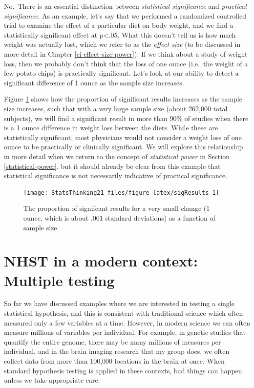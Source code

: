 \documentclass[
  12pt,
]{book}
\begin{document}
No.~There is an essential distinction between \emph{statistical significance} and \emph{practical significance}. As an example, let's say that we performed a randomized controlled trial to examine the effect of a particular diet on body weight, and we find a statistically significant effect at p\textless.05. What this doesn't tell us is how much weight was actually lost, which we refer to as the \emph{effect size} (to be discussed in more detail in Chapter \ref{ci-effect-size-power}). If we think about a study of weight loss, then we probably don't think that the loss of one ounce (i.e.~the weight of a few potato chips) is practically significant. Let's look at our ability to detect a significant difference of 1 ounce as the sample size increases.

Figure \ref{fig:sigResults} shows how the proportion of significant results increases as the sample size increases, such that with a very large sample size (about 262,000 total subjects), we will find a significant result in more than 90\% of studies when there is a 1 ounce difference in weight loss between the diets. While these are statistically significant, most physicians would not consider a weight loss of one ounce to be practically or clinically significant. We will explore this relationship in more detail when we return to the concept of \emph{statistical power} in Section \ref{statistical-power}, but it should already be clear from this example that statistical significance is not necessarily indicative of practical significance.

\begin{figure}
\texttt{[image: StatsThinking21\_files/figure-latex/sigResults-1]} \caption{The proportion of signifcant results for a very small change (1 ounce, which is about .001 standard deviations) as a function of sample size.}\label{fig:sigResults}
\end{figure}

\hypertarget{nhst-in-a-modern-context-multiple-testing}{%
\section{NHST in a modern context: Multiple testing}\label{nhst-in-a-modern-context-multiple-testing}}

So far we have discussed examples where we are interested in testing a single statistical hypothesis, and this is consistent with traditional science which often measured only a few variables at a time. However, in modern science we can often measure millions of variables per individual. For example, in genetic studies that quantify the entire genome, there may be many millions of measures per individual, and in the brain imaging research that my group does, we often collect data from more than 100,000 locations in the brain at once. When standard hypothesis testing is applied in these contexts, bad things can happen unless we take appropriate care.
\end{document}
